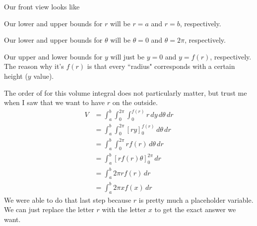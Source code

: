 \documentclass{article}
\newcommand{\lrb}[1]{\left[ #1 \right]}
\begin{document}
Our front view looks like
\begin{center}
\end{center}
Our lower and upper bounds for $r$ will be $r=a$ and $r=b$, respectively. 

Our lower and upper bounds for $\theta$ will be $\theta=0$ and $\theta=2\pi$, respectively.

Our upper and lower bounds for $y$ will just be $y=0$ and $y=f(r)$, respectively. The reason why it's $f(r)$ is that every ``radius" corresponds with a certain height ($y$ value).

The order of for this volume integral does not particularly matter, but trust me when I saw that we want to have $r$ on the outside.
\begin{align*}
    V&=\int_a^b\int_0^{2\pi}\int_0^{f(r)}r\,dy\,d\theta\,dr\\
    &=\int_a^b\int_0^{2\pi}\lrb{ry}_0^{f(r)}\,d\theta\,dr\\
    &=\int_a^b\int_0^{2\pi} rf(r)\,d\theta\,dr\\
    &=\int_a^b\lrb{rf(r)\theta}_0^{2\pi}\,dr\\
    &=\int_a^b 2\pi rf(r)\,dr\\
    &=\boxed{\int_a^b 2\pi xf(x)\,dr}
\end{align*}
We were able to do that last step because $r$ is pretty much a placeholder variable. We can just replace the letter $r$ with the letter $x$ to get the exact answer we want.
\end{document}
